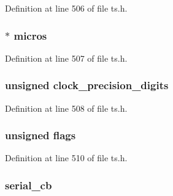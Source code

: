 Definition at line 506 of file ts.\+h.

\subsubsection[{\texorpdfstring{micros}{micros}}]{ $\ast$ micros}\hypertarget{struct_t_s__resp__ctx_a0b58c483824a9d659c9d66f0513d8b50}{}\label{struct_t_s__resp__ctx_a0b58c483824a9d659c9d66f0513d8b50}


Definition at line 507 of file ts.\+h.

\subsubsection[{\texorpdfstring{clock\+\_\+precision\+\_\+digits}{clock_precision_digits}}]{\setlength{\rightskip}{0pt plus 5cm}unsigned clock\+\_\+precision\+\_\+digits}\hypertarget{struct_t_s__resp__ctx_a3edc4d8d7d241b04512e9b014d96eff7}{}\label{struct_t_s__resp__ctx_a3edc4d8d7d241b04512e9b014d96eff7}


Definition at line 508 of file ts.\+h.

\subsubsection[{\texorpdfstring{flags}{flags}}]{\setlength{\rightskip}{0pt plus 5cm}unsigned flags}\hypertarget{struct_t_s__resp__ctx_a8b08a4d2ec878257d64c55f64a62242c}{}\label{struct_t_s__resp__ctx_a8b08a4d2ec878257d64c55f64a62242c}


Definition at line 510 of file ts.\+h.

\subsubsection[{\texorpdfstring{serial\+\_\+cb}{serial_cb}}]{ serial\+\_\+cb}\hypertarget{struct_t_s__resp__ctx_afab1d0413d4938f91b9f65f2fb0fd9e9}{}\label{struct_t_s__resp__ctx_afab1d0413d4938f91b9f65f2fb0fd9e9}


